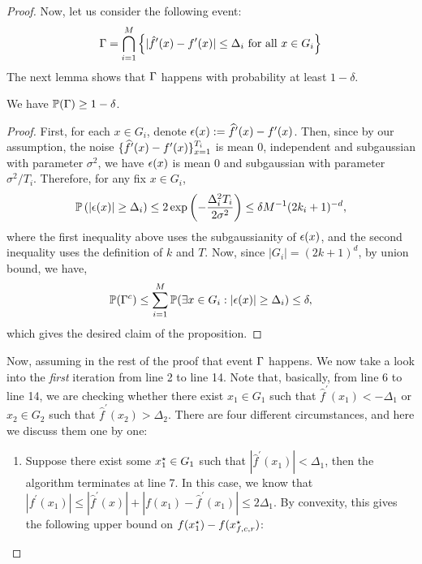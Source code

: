 \begin{proof}
Now, let us consider the following event: 
\begin{equation*}
\Gamma = \bigcap_{i=1}^M \left\{|\hat{f}^\prime(x) - f^\prime(x)| \leq \Delta_i ~\text{for all $x \in G_i$}\right\}
\end{equation*}
The next lemma shows that $\Gamma$ happens with probability at least $1-\delta$. 
\begin{lemma}
We have $\mathbb{P}(\Gamma) \geq 1-\delta$. 
\end{lemma}
\begin{proof}
First, for each $x \in G_i$, denote $\epsilon(x) := \widehat{f}^\prime(x) - f^\prime(x)$.  
Then, since by our assumption, the noise $\{\widehat{f}^\prime(x) - f^\prime(x)\}_{x=1}^{T_i}$ 
is mean $0$, independent and subgaussian with parameter $\sigma^2$, we have 
$\epsilon(x)$ is mean $0$ and subgaussian with parameter $\sigma^2/T_i$. 
Therefore, for any fix $x\in G_i$, 
\begin{align*}
\mathbb{P}\left(|\epsilon(x)| \geq \Delta_i \right) 
		\leq 2\exp\left(-\frac{\Delta_i^2T_i}{2\sigma^2}\right) 
			\leq \delta M^{-1} (2k_i+1)^{-d}, 
\end{align*}
where the first inequality above uses the subgaussianity of $\epsilon(x)$, and 
the second inequality uses the definition of $k$ and $T$. 
Now, since $|G_i| = (2k+1)^d$, by union bound, we have, 
\begin{equation*}
\mathbb{P}(\Gamma^c) \leq \sum_{i=1}^M \mathbb{P}(\exists x \in G_i: |\epsilon(x)|\geq \Delta_i) \leq \delta,
\end{equation*} 
which gives the desired claim of the proposition. 
\end{proof}
Now, assuming in the rest of the proof that event $\Gamma$ happens. We now take a 
look into the \emph{first} iteration from line 2 to line 14. Note that, basically, from 
line 6 to line 14, we are checking whether there exist $x_1\in G_1$ such that 
$\hat{f}^\prime(x_1) < -\Delta_1$ or $x_2\in G_2$ such that $\hat{f}^\prime(x_2) > \Delta_2$. 
There are four different circumstances, and here we discuss them one by one: 
\begin{enumerate}
\item Suppose there exist some $x_1^\star \in G_1$ such that 
	$|\hat{f}^\prime(x_1)| < \Delta_1$, then the algorithm terminates at line 7. 
	In this case, we know that 
	$|f^\prime(x_1)| \leq |\hat{f}^\prime(x)| + |f(x_1) - \hat{f}^\prime(x_1)| \leq 2\Delta_1$. 
	By convexity, this gives the following upper bound on $f(x_1^\star) - f(x_{f, c, r}^\star)$: 

\end{enumerate}
\end{proof}
